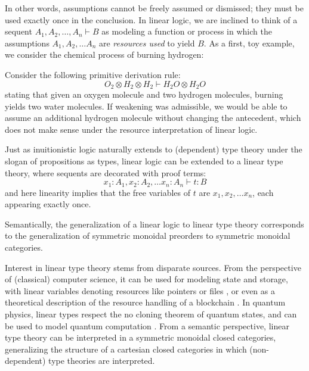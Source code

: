 In other words, assumptions cannot be freely assumed or dismissed; they must be used exactly once in the conclusion. In linear logic, we are inclined to think of a sequent $A_1, A_2, \dots, A_n \vdash B$ as modeling a function or process in which the assumptions $A_1, A_2, \dots A_n$ are \textit{resources used} to yield $B$. As a first, toy example, we consider the chemical process of burning hydrogen:
\begin{expl}\label{burn}
Consider the following primitive derivation rule: 
\[
  O_2 \otimes H_2 \otimes H_2 \vdash H_2O \otimes H_2O
\]
stating that given an oxygen molecule and two hydrogen molecules, burning yields two water molecules. If weakening was admissible, we would be able to assume an additional hydrogen molecule without changing the antecedent, which does not make sense under the resource interpretation of linear logic.
\end{expl}

Just as inuitionistic logic naturally extends to (dependent) type theory under the slogan of propositions as types, linear logic can be extended to a linear type theory, where sequents are decorated with proof terms:
\[
  x_1 : A_1, x_2 : A_2, \dots x_n : A_n \vdash t : B
\]
and here linearity implies that the free variables of $t$ are $x_1, x_2, \dots x_n$, each appearing exactly once.


Semantically, the generalization of a linear logic to linear type theory corresponds to the generalization of symmetric monoidal preorders to symmetric monoidal categories.


Interest in linear type theory stems from disparate sources. From the perspective of (classical) computer science, it can be used for modeling state and storage, with linear variables denoting resources like pointers or files \cite{krishnaswami}, or even as a theoretical description of the resource handling of a blockchain \cite{meredith2015linear}. In quantum physics, linear types respect the no cloning theorem of quantum states, and can be used to model quantum computation \cite{duncan2006types}. From a semantic perspective, linear type theory can be interpreted in a symmetric monoidal closed categories, generalizing the structure of a cartesian closed categories in which (non-dependent) type theories are interpreted.


